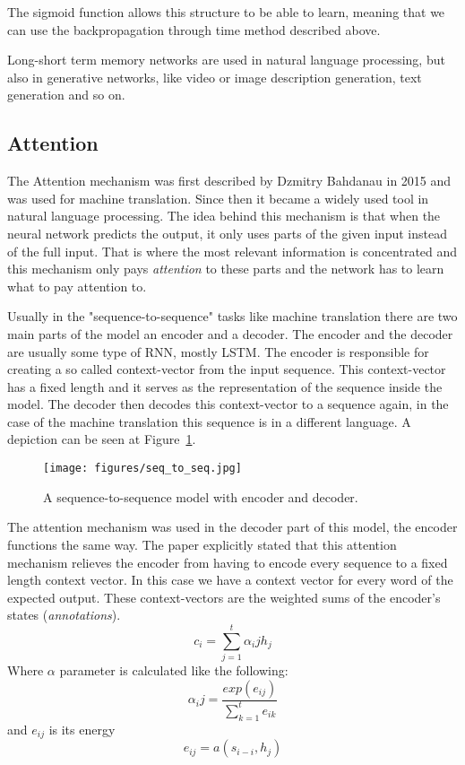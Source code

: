 The sigmoid function allows this structure to be able to learn, meaning that we can use the backpropagation through time method described above.

Long-short term memory networks are used in natural language processing, but also in generative networks, like video or image description generation, text generation and so on.

\subsection{Attention}
The Attention mechanism was first described by Dzmitry Bahdanau in 2015 \cite{Bahdanau:2015} and was used for machine translation. Since then it became a widely used tool in natural language processing. The idea behind this mechanism is that when the neural network predicts the output, it only uses parts of the given input instead of the full input. That is where the most relevant information is concentrated and this mechanism only pays \textit{attention} to these parts and the network has to learn what to pay attention to.

Usually in the "sequence-to-sequence" tasks like machine translation there are two main parts of the model an encoder and a decoder. The encoder and the decoder are usually some type of RNN, mostly LSTM. The encoder is responsible for creating a so called context-vector from the input sequence. This context-vector has a fixed length and it serves as the representation of the sequence inside the model. The decoder then decodes this context-vector to a sequence again, in the case of the machine translation this sequence is in a different language. A depiction can be seen at Figure~\ref{fig:seq_to_seq}.
\begin{figure}[!ht]
	\centering
	\texttt{[image: figures/seq\_to\_seq.jpg]}
	\caption{A sequence-to-sequence model with encoder and decoder.}
	\label{fig:seq_to_seq}
\end{figure}

The attention mechanism was used in the decoder part of this model, the encoder functions the same way. The paper explicitly stated that this attention mechanism relieves the encoder from having to encode every sequence to a fixed length context vector. In this case we have a context vector for every word of the expected output. These context-vectors are the weighted sums of the encoder's states (\textit{annotations}).
\[c_i = \sum_{j=1}^{t} \alpha_ij h_j\]
Where \(\alpha\) parameter is calculated like the following:
\[\alpha_ij = \frac{exp(e_{ij})}{\sum_{k=1}^{t} e_{ik}} \]
and \(e_{ij}\) is its energy
\[e_{ij} = a(s_{i-i}, h_j)\]

